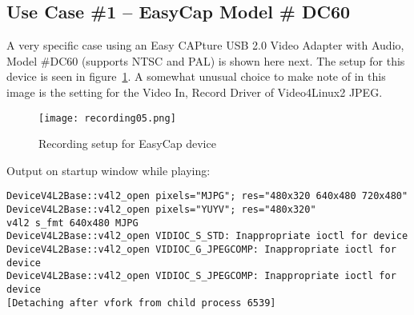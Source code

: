 \subsection{Use Case \#1 – EasyCap Model \# DC60}
\label{sub:use_case_easycap_model_dc60}

A very specific case using an Easy CAPture USB 2.0 Video Adapter with Audio, Model \#DC60 (supports
NTSC and PAL) is shown here next. The setup for this device is seen in figure~\ref{fig:recording-usb}.
A somewhat unusual choice to make note of in this image is the setting for the Video In, Record Driver
of Video4Linux2 JPEG. 

\begin{figure}[htpb]
    \centering
    \texttt{[image: recording05.png]}
    \caption{Recording setup for EasyCap device}
    \label{fig:recording-usb}
\end{figure}

Output on startup window while playing:
\begin{lstlisting}[style=sh]
DeviceV4L2Base::v4l2_open pixels="MJPG"; res="480x320 640x480 720x480"
DeviceV4L2Base::v4l2_open pixels="YUYV"; res="480x320"
v4l2 s_fmt 640x480 MJPG
DeviceV4L2Base::v4l2_open VIDIOC_S_STD: Inappropriate ioctl for device
DeviceV4L2Base::v4l2_open VIDIOC_G_JPEGCOMP: Inappropriate ioctl for device
DeviceV4L2Base::v4l2_open VIDIOC_S_JPEGCOMP: Inappropriate ioctl for device
[Detaching after vfork from child process 6539]
\end{lstlisting}

